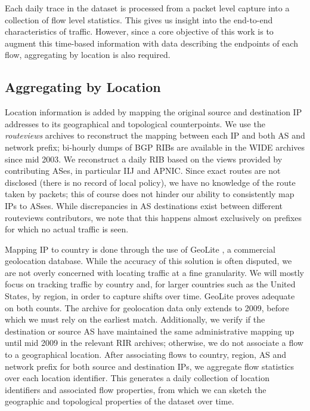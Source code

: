 Each daily trace in the dataset is processed from a packet level capture into a collection of flow level statistics. 
This gives us insight into the end-to-end characteristics of traffic. 
However, since a core objective of this work is to augment this time-based information with data describing the endpoints of each flow, aggregating by location is also required. 

\subsection{Aggregating by Location}

Location information is added by mapping the original source and destination \ac{IP} addresses to its geographical and topological counterpoints. 
We use the \emph{routeviews} archives to reconstruct the mapping between each \ac{IP} and both \ac{AS} and network prefix; bi-hourly dumps of \ac{BGP} \acp{RIB} are available in the \ac{WIDE} archives since mid 2003. 
We reconstruct a daily \ac{RIB} based on the views provided by contributing ASes, in particular \ac{IIJ} and \ac{APNIC}.
Since exact routes are not disclosed (there is no record of local policy), we have no knowledge of the route taken by packets; this of course does not hinder our ability to consistently map \acp{IP} to \acp{AS}es. 
While discrepancies in \ac{AS} destinations exist between different routeviews contributors, we note that this happens almost exclusively on prefixes for which no actual traffic is seen. 

Mapping \ac{IP} to country is done through the use of GeoLite \cite{maxmind}, a commercial geolocation database. 
While the accuracy of this solution is often disputed, we are not overly concerned with locating traffic at a fine granularity. 
We will mostly focus on tracking traffic by country and, for larger countries such as the United States, by region, in order to capture shifts over time.
GeoLite proves adequate on both counts.
The archive for geolocation data only extends to 2009, before which we must rely on the earliest match. 
Additionally, we verify if the destination or source AS have maintained the same administrative mapping up until mid 2009 in the relevant \ac{RIR} archives; otherwise, we do not associate a flow to a geographical location.
After associating flows to country, region, \ac{AS} and network prefix for both source and destination IPs, we aggregate flow statistics over each location identifier. 
This generates a daily collection of location identifiers and associated flow properties, from which we can sketch the geographic and topological properties of the dataset over time.
